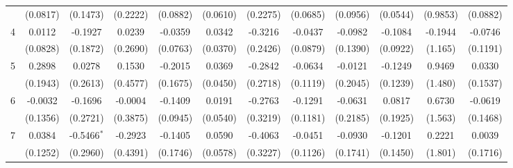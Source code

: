 \begin{adjustbox}{width=650}
\begin{tabular}{lccccccccccc}
                                            & (0.0817) & (0.1473)             & (0.2222)                   & (0.0882)      & (0.0610)                      & (0.2275)                    & (0.0685)              & (0.0956)         & (0.0544)      & (0.9853)    & (0.0882)\\   
    4     & 0.0112   & -0.1927              & 0.0239                     & -0.0359       & 0.0342                        & -0.3216                     & -0.0437               & -0.0982          & -0.1084       & -0.1944     & -0.0746\\   
                                            & (0.0828) & (0.1872)             & (0.2690)                   & (0.0763)      & (0.0370)                      & (0.2426)                    & (0.0879)              & (0.1390)         & (0.0922)      & (1.165)     & (0.1191)\\   
    5     & 0.2898   & 0.0278               & 0.1530                     & -0.2015       & 0.0369                        & -0.2842                     & -0.0634               & -0.0121          & -0.1249       & 0.9469      & 0.0330\\   
                                            & (0.1943) & (0.2613)             & (0.4577)                   & (0.1675)      & (0.0450)                      & (0.2718)                    & (0.1119)              & (0.2045)         & (0.1239)      & (1.480)     & (0.1537)\\   
    6     & -0.0032  & -0.1696              & -0.0004                    & -0.1409       & 0.0191                        & -0.2763                     & -0.1291               & -0.0631          & 0.0817        & 0.6730      & -0.0619\\   
                                            & (0.1356) & (0.2721)             & (0.3875)                   & (0.0945)      & (0.0540)                      & (0.3219)                    & (0.1181)              & (0.2185)         & (0.1925)      & (1.563)     & (0.1468)\\   
    7     & 0.0384   & -0.5466$^{*}$        & -0.2923                    & -0.1405       & 0.0590                        & -0.4063                     & -0.0451               & -0.0930          & -0.1201       & 0.2221      & 0.0039\\   
                                            & (0.1252) & (0.2960)             & (0.4391)                   & (0.1746)      & (0.0578)                      & (0.3227)                    & (0.1126)              & (0.1741)         & (0.1450)      & (1.801)     & (0.1716)\\   

\end{tabular}
\end{adjustbox}
